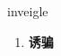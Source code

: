 
\begin{frame}
{\huge inveigle}
\begin{center}
\begin{enumerate}\Large
  \item \textbf{诱骗}
\end{enumerate}
\end{center}
\end{frame}

